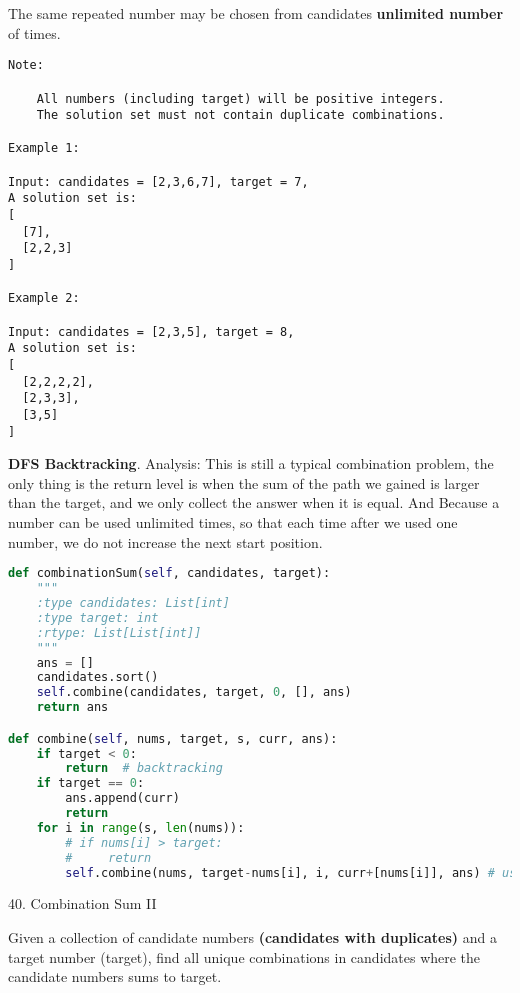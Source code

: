 \documentclass[../main.tex]{subfiles}
\begin{document}
The same repeated number may be chosen from candidates \textbf{unlimited number} of times.
\begin{lstlisting}
Note:

    All numbers (including target) will be positive integers.
    The solution set must not contain duplicate combinations.

Example 1:

Input: candidates = [2,3,6,7], target = 7,
A solution set is:
[
  [7],
  [2,2,3]
]

Example 2:

Input: candidates = [2,3,5], target = 8,
A solution set is:
[
  [2,2,2,2],
  [2,3,3],
  [3,5]
]
\end{lstlisting}
\textbf{DFS Backtracking}. Analysis: This is still a typical combination problem, the only thing is the return level is when the sum of the path we gained is larger than the target, and we only collect the answer when it is equal. And Because a number can be used unlimited times, so that each time after we used one number, we do not increase the next start position. 
\begin{lstlisting}[language=Python]
def combinationSum(self, candidates, target):
    """
    :type candidates: List[int]
    :type target: int
    :rtype: List[List[int]]
    """
    ans = []
    candidates.sort()
    self.combine(candidates, target, 0, [], ans)
    return ans

def combine(self, nums, target, s, curr, ans):
    if target < 0:
        return  # backtracking
    if target == 0:
        ans.append(curr)
        return 
    for i in range(s, len(nums)):
        # if nums[i] > target:
        #     return
        self.combine(nums, target-nums[i], i, curr+[nums[i]], ans) # use i, instead of i+1 because we can reuse
\end{lstlisting}
40. Combination Sum II

Given a collection of candidate numbers \textbf{(candidates with duplicates)} and a target number (target), find all unique combinations in candidates where the candidate numbers sums to target.
\end{document}
